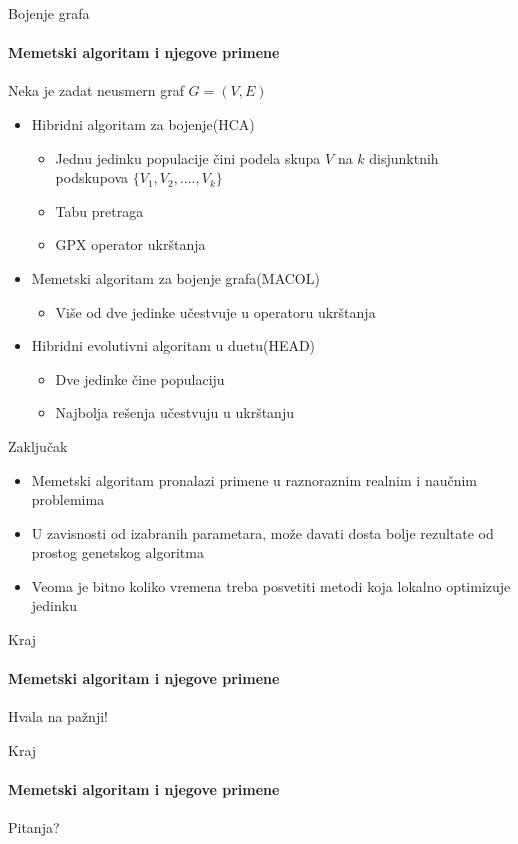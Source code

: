 \documentclass{beamer}
\begin{document}
\begin{frame}[fragile]{Bojenje grafa}
  \framesubtitle{Memetski algoritam i njegove primene}

Neka je zadat neusmern graf $G = (V, E)$

   \begin{itemize}
    \item{Hibridni algoritam za bojenje(HCA)}
        \begin{itemize}
            \item Jednu jedinku populacije čini podela skupa $V$ na $k$  disjunktnih podskupova $\{V_1, V_2, ...., V_k\}$
            \item Tabu pretraga
            \item GPX operator ukrštanja \cite{galinier1999hybrid}
        \end{itemize}
    \item{Memetski algoritam za bojenje grafa(MACOL)}
        \begin{itemize}
            \item Više od dve jedinke učestvuje u operatoru ukrštanja
        \end{itemize}
    \item{Hibridni evolutivni algoritam u duetu(HEAD)}
        \begin{itemize}
            \item Dve jedinke čine populaciju
            \item Najbolja rešenja učestvuju u ukrštanju
        \end{itemize}
  \end{itemize}
  

\end{frame}




\begin{frame}[fragile]{Zaključak}
  
   \begin{itemize}
    \item{Memetski algoritam pronalazi primene u raznoraznim realnim i naučnim problemima}
    \item{U zavisnosti od izabranih parametara, može davati dosta bolje rezultate od prostog genetskog algoritma}
    \item{Veoma je bitno koliko vremena treba posvetiti metodi koja lokalno optimizuje jedinku}
    
    \end{itemize}
\end{frame}


\begin{frame}{Kraj}
  \framesubtitle{Memetski algoritam i njegove primene}

  
\centering
\Huge{Hvala na pažnji!}

\end{frame}




\begin{frame}{Kraj}
  \framesubtitle{Memetski algoritam i njegove primene}
\centering
\Huge{Pitanja?}

\end{frame}

 

\end{document}
